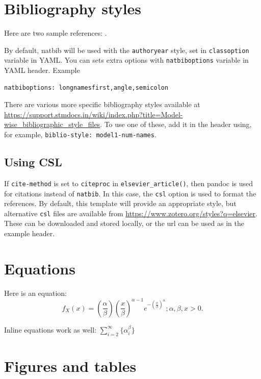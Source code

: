 \documentclass[
  super,
  preprint,
  3p]{elsarticle}
\begin{document}
\section{Bibliography styles}\label{bibliography-styles}

Here are two sample references: \citet{Feynman1963118}
\citet{Dirac1953888}.

By default, natbib will be used with the \texttt{authoryear} style, set
in \texttt{classoption} variable in YAML. You can sets extra options
with \texttt{natbiboptions} variable in YAML header. Example

\begin{verbatim}
natbiboptions: longnamesfirst,angle,semicolon
\end{verbatim}

There are various more specific bibliography styles available at
\url{https://support.stmdocs.in/wiki/index.php?title=Model-wise_bibliographic_style_files}.
To use one of these, add it in the header using, for example,
\texttt{biblio-style:\ model1-num-names}.

\subsection{Using CSL}\label{using-csl}

If \texttt{cite-method} is set to \texttt{citeproc} in
\texttt{elsevier\_article()}, then pandoc is used for citations instead
of \texttt{natbib}. In this case, the \texttt{csl} option is used to
format the references. By default, this template will provide an
appropriate style, but alternative \texttt{csl} files are available from
\url{https://www.zotero.org/styles?q=elsevier}. These can be downloaded
and stored locally, or the url can be used as in the example header.

\section{Equations}\label{equations}

Here is an equation: \[ 
  f_{X}(x) = \left(\frac{\alpha}{\beta}\right)
  \left(\frac{x}{\beta}\right)^{\alpha-1}
  e^{-\left(\frac{x}{\beta}\right)^{\alpha}}; 
  \alpha,\beta,x > 0 .
\]

Inline equations work as well: \(\sum_{i = 2}^\infty\{\alpha_i^\beta\}\)

\section{Figures and tables}\label{figures-and-tables}
\end{document}

